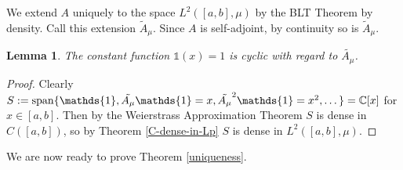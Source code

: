\documentclass[12pt,oneside]{report}
\newtheorem{lem}[thm]{Lemma}
\begin{document}
We extend $A$ uniquely to the space $L^2([a,b],\mu)$ by the BLT Theorem by density. Call this extension $\tilde{A}_\mu$. Since $A$ is self-adjoint, by continuity so is $\tilde{A}_{\mu}$.

\begin{lem}\label{cyclic-A}
    The constant function $\mathds{1}(x) = 1$ is cyclic with regard to $\tilde{A_{\mu}}$.
\end{lem}
\begin{proof}
    Clearly $S := \spanrm\{ \mathds{1}, \tilde{A_{\mu}}\mathds{1} = x, \tilde{A_{\mu}}^{2}\mathds{1} = x^{2}, \dots \} = \mathbb{C}[x]$ for $x \in [a,b]$. Then by the Weierstrass Approximation Theorem $S$ is dense in $C([a,b])$, so by Theorem \ref{C-dense-in-Lp} $S$ is dense in $L^{2}([a,b],\mu)$.
\end{proof}

We are now ready to prove Theorem \ref{uniqueness}.
\end{document}

